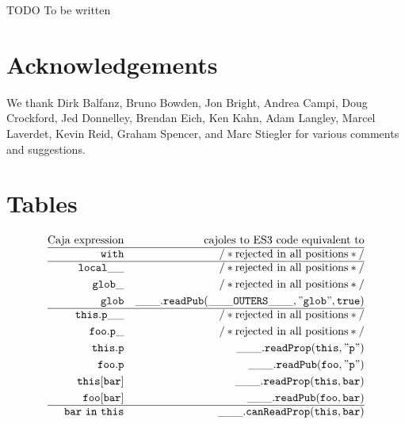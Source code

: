 \documentclass[letterpaper,twocolumn,10pt]{article}
\newcommand{\code}[1]{{\tt {#1}}}              %
\begin{document}
TODO To be written

\section{Acknowledgements}

We thank 
Dirk Balfanz,
Bruno Bowden,
Jon Bright,
Andrea Campi,
Doug Crockford,
Jed Donnelley,
Brendan Eich,
Ken Kahn,
Adam Langley,
Marcel Laverdet,
Kevin Reid,
Graham Spencer,
and
Marc Stiegler
for various comments and suggestions.

\appendix

\section{Tables}

\begin{figure}
\begin{eqnarray}
  \mathrm{Caja\ expression} & \nonumber                 & \mathrm{cajoles\ to\ ES3\ code\ equivalent\ to} \\
  \hline
  \code{with}               & \label{with:bad}          & \mathrm{/*rejected\ in\ all\ positions*/} \\
  \hline
  \code{local\_\_}          & \label{var:bad-suffix}    & \mathrm{/*rejected\ in\ all\ positions*/} \\
  \code{glob\_}             & \label{var:bad-global-suffix} & \mathrm{/*rejected\ in\ all\ positions*/} \\
  \code{glob}               & \label{var:global}        & \code{\_\_\_.readPub(\_\_\_OUTERS\_\_\_,"glob",true)} \\
  \hline
  \code{this.p\_\_}         & \label{read:bad-suffix}   & \mathrm{/*rejected\ in\ all\ positions*/} \\
  \code{foo.p\_}            & \label{read:bad-internal} & \mathrm{/*rejected\ in\ all\ positions*/} \\
  \code{this.p}             & \label{read:internal}     & \code{\_\_\_.readProp(this,"p")} \\
  \code{foo.p}              & \label{read:public}       & \code{\_\_\_.readPub(foo,"p")} \\
  \code{this[bar]}          & \label{read:index-internal} & \code{\_\_\_.readProp(this,bar)} \\
  \code{foo[bar]}           & \label{read:index-public} & \code{\_\_\_.readPub(foo,bar)} \\
  \hline
  \code{bar\ in\ this}      & \label{in:internal}       & \code{\_\_\_.canReadProp(this,bar)} \\

\end{eqnarray}
\end{figure}
\end{document}
